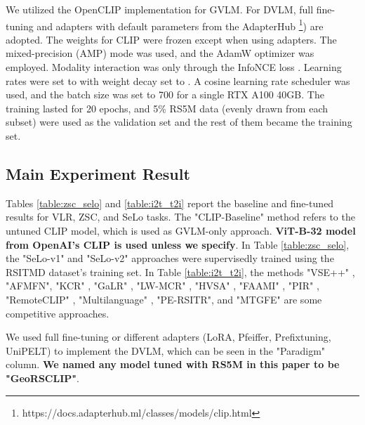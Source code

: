 \documentclass[journal]{IEEEtran}
\begin{document}
We utilized the OpenCLIP implementation for GVLM. For DVLM, full fine-tuning and adapters with default parameters from the AdapterHub \footnote{https://docs.adapterhub.ml/classes/models/clip.html}) are adopted. The weights for CLIP were frozen except when using adapters. The mixed-precision (AMP) mode was used, and the AdamW optimizer \cite{adamw} was employed. Modality interaction was only through the InfoNCE loss \cite{infonce}. Learning rates were set to  with weight decay set to . A cosine learning rate scheduler was used, and the batch size was set to 700 for a single RTX A100 40GB. The training lasted for 20 epochs, and 5\% RS5M data (evenly drawn from each subset) were used as the validation set and the rest of them became the training set.

\subsection{Main Experiment Result}

Tables \ref{table:zsc_selo}  and \ref{table:i2t_t2i} report the baseline and fine-tuned results for VLR, ZSC, and SeLo tasks. The "CLIP-Baseline" method refers to the untuned CLIP model, which is used as GVLM-only approach. \textbf{ViT-B-32 model from OpenAI's CLIP is used unless we specify}. In Table \ref{table:zsc_selo}, the "SeLo-v1" \cite{selo} and "SeLo-v2" \cite{selov2} approaches were supervisedly trained using the RSITMD dataset's training set. In Table \ref{table:i2t_t2i}, the methods "VSE++" \cite{vse++}, "AFMFN"\cite{RSITMD}, "KCR" \cite{kcr}, "GaLR" \cite{galr}, "LW-MCR" \cite{LW-MCR}, "HVSA" \cite{hvsa}, "FAAMI" \cite{Zheng_2023}, "PIR" \cite{pir}, "RemoteCLIP" \cite{liu2023remoteclip}, "Multilanguage" \cite{multilingual}, "PE-RSITR"\cite{yuan2023parameterefficient}, and "MTGFE"\cite{MTGFE} are some competitive approaches. 

We used full fine-tuning or different adapters (LoRA, Pfeiffer, Prefixtuning, UniPELT) to implement the DVLM, which can be seen in the "Paradigm" column. \textbf{We named any model tuned with RS5M in this paper to be "GeoRSCLIP"}. 
\end{document}
